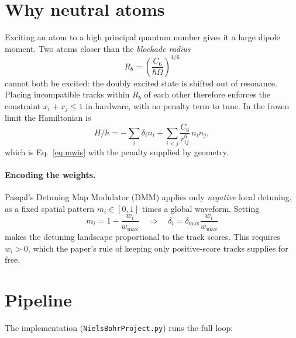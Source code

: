 \documentclass[10pt,twocolumn]{article}
\begin{document}
\section{Why neutral atoms}

Exciting an atom to a high principal quantum number gives it a large dipole
moment. Two atoms closer than the \emph{blockade radius}
\begin{equation}
  R_b = \left(\frac{C_6}{\hbar\Omega}\right)^{1/6}
  \label{eq:rb}
\end{equation}
cannot both be excited: the doubly excited state is shifted out of resonance.
Placing incompatible tracks within $R_b$ of each other therefore enforces the
constraint $x_i + x_j \le 1$ in hardware, with no penalty term to tune. In the
frozen limit the Hamiltonian is
\begin{equation}
  H/\hbar = -\sum_i \delta_i n_i + \sum_{i<j} \frac{C_6}{r_{ij}^6}\, n_i n_j ,
  \label{eq:ham}
\end{equation}
which is Eq.~\eqref{eq:mwis} with the penalty supplied by geometry.

\paragraph{Encoding the weights.} Pasqal's Detuning Map Modulator (DMM) applies
only \emph{negative} local detuning, as a fixed spatial pattern $m_i \in [0,1]$
times a global waveform. Setting
\begin{equation}
  m_i = 1 - \frac{w_i}{w_{\max}}
  \quad\Longrightarrow\quad
  \delta_i = \delta_{\max}\frac{w_i}{w_{\max}}
\end{equation}
makes the detuning landscape proportional to the track scores. This requires
$w_i > 0$, which the paper's rule of keeping only positive-score tracks supplies
for free.

\section{Pipeline}

The implementation (\texttt{NielsBohrProject.py}) runs the full loop:
\end{document}
